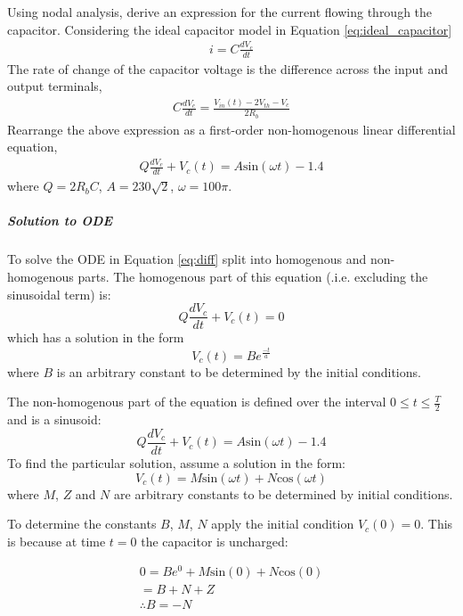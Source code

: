 Using nodal analysis, derive an expression for the current flowing through the capacitor. Considering the ideal capacitor model in Equation \ref{eq:ideal_capacitor}
\begin{align}
	i = C\frac{dV_c}{dt}
\end{align}
The rate of change of the capacitor voltage is the difference across the input and output terminals,
\begin{align}
	C\frac{dV_c}{dt} = \frac{V_{in}(t) - 2V_{th} - V_c}{2R_b}
\end{align}
Rearrange the above expression as a first-order non-homogenous linear differential equation,
\begin{align}
	Q\frac{dV_c}{dt} + V_c(t) = A\text{sin}(\omega t) - 1.4
	\label{eq:diff}
\end{align}
where $Q = 2R_bC$, $A = 230\sqrt{2}$, $\omega = 100\pi$.

\subparagraph{Solution to ODE} To solve the ODE in Equation \ref{eq:diff} split into homogenous and non-homogenous parts. The homogenous part of this equation (.i.e. excluding the sinusoidal term) is:
\begin{equation}
	Q\frac{dV_c}{dt} + V_c(t) = 0
\end{equation}
which has a solution in the form
\begin{equation}
	V_c(t) = Be^{\frac{-t}{a}}
\end{equation}
where $B$ is an arbitrary constant to be determined by the initial conditions. 

The non-homogenous part of the equation is defined over the interval $0 \leq t \leq \frac{T}{2}$ and is a sinusoid:
\begin{equation}
	Q\frac{dV_c}{dt} + V_c(t) = A\text{sin}(\omega t) - 1.4
\end{equation}
To find the particular solution, assume a solution in the form:
\begin{equation}
	V_c(t) = M\text{sin}(\omega t) + N\text{cos}(\omega t) 
	\label{vc_t}
\end{equation}
where $M$, $Z$ and $N$ are arbitrary constants to be determined by initial conditions. 

\pagebreak
To determine the constants $B$, $M$, $N$ apply the initial condition $V_c(0) = 0$. This is because at time $t=0$ the capacitor is uncharged:

\begin{equation}
	\begin{split}
		0 = Be^{0} + M\text{sin}(0) + N\text{cos}(0) \\
		  = B + N + Z \\
		  \therefore B = -N
	\end{split}
\end{equation} 

